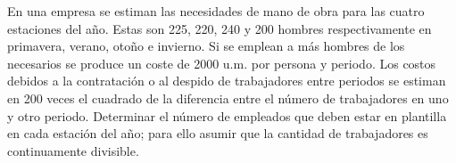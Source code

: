 \documentclass[twoside]{article}
\begin{document}
\newpage 
\begin{ejercicio}{5}
En una empresa se estiman las necesidades de mano de obra para las cuatro estaciones del año.
Estas son 225, 220, 240 y 200 hombres respectivamente en primavera, verano, otoño e invierno.
Si se emplean a más hombres de los necesarios se produce un coste de 2000 u.m. por persona
y periodo. Los costos debidos a la contratación o al despido de trabajadores entre periodos se
estiman en 200 veces el cuadrado de la diferencia entre el número de trabajadores en uno y otro
periodo.
Determinar el número de empleados que deben estar en plantilla en cada estación del año; para
ello asumir que la cantidad de trabajadores es continuamente divisible.
\begin{solucion}
\end{solucion}
\end{ejercicio}
\end{document}
